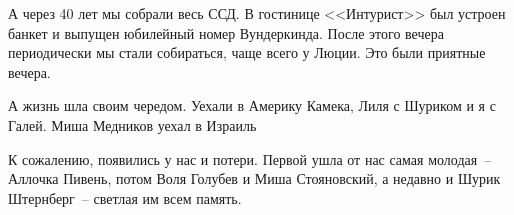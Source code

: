 А через 40 лет мы собрали весь ССД. В гостинице <<Интурист>> был устроен банкет и выпущен юбилейный номер Вундеркинда. После этого вечера периодически мы стали собираться, чаще всего у Люции. Это были приятные вечера.

А жизнь шла своим чередом. Уехали в Америку Камека, Лиля с Шуриком и я с Галей. Миша Медников уехал в Израиль

К сожалению, появились у нас и потери. Первой ушла от нас самая молодая~-- Аллочка Пивень, потом Воля Голубев и Миша Стояновский, а недавно и Шурик Штернберг~-- светлая им всем память.


\begin{figure}[h!]
    

\end{figure}